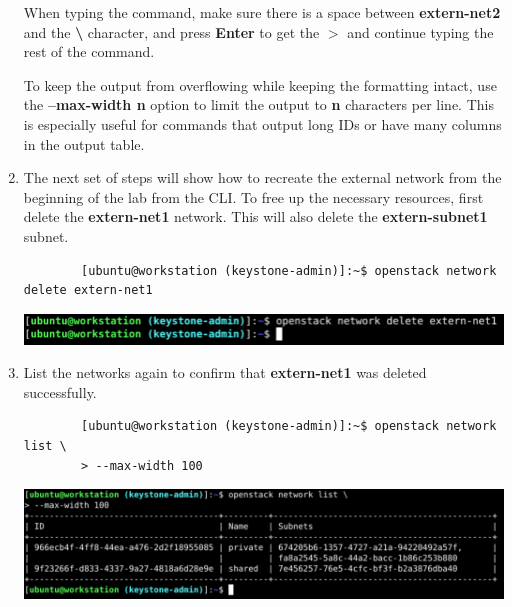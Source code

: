 \documentclass[letterpaper, 12pt]{article}
\begin{document}
\begin{enumerate}
    \begin{tipbox}
        When typing the command, make sure there is a space between \textbf{extern-net2} and the \textbf{\textbackslash} character, and press \textbf{Enter} to get the \textbf{$>$} and continue typing the rest of the command.
    \end{tipbox}

    \begin{tipbox}
        To keep the output from overflowing while keeping the formatting intact, use the \textbf{--max-width n} option to limit the output to \textbf{n} characters per line.
        This is especially useful for commands that output long IDs or have many columns in the output table.
    \end{tipbox}

    \item The next set of steps will show how to recreate the external network from the beginning of the lab from the CLI.
    To free up the necessary resources, first delete the \textbf{extern-net1} network.
    This will also delete the \textbf{extern-subnet1} subnet.
    \begin{lstlisting}
        [ubuntu@workstation (keystone-admin)]:~$ openstack network delete extern-net1
    \end{lstlisting}

    \begin{center}
        \includegraphics[width=\linewidth]{images/part1/step13.png}
    \end{center}

    \item List the networks again to confirm that \textbf{extern-net1} was deleted successfully.
    \begin{lstlisting}
        [ubuntu@workstation (keystone-admin)]:~$ openstack network list \
        > --max-width 100
    \end{lstlisting}

    \begin{center}
        \includegraphics[width=\linewidth]{images/part1/step14.png}
    \end{center}


\end{enumerate}
\end{document}
